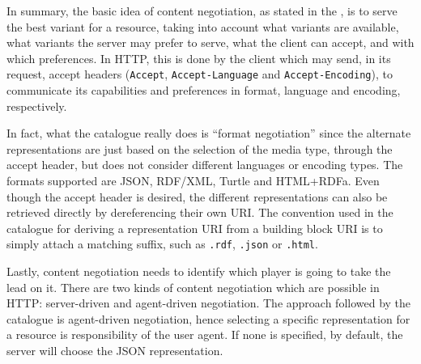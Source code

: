 
In summary, the basic idea of content negotiation, as stated in the \cite{http1.1}, is to serve the best variant for a resource, taking into account what variants are available, what variants the server may prefer to serve, what the client can accept, and with which preferences. In HTTP, this is done by the client which may send, in its request, accept headers (\texttt{Accept}, \texttt{Accept-Language} and \texttt{Accept-Encoding}), to communicate its capabilities and preferences in format, language and encoding, respectively.

In fact, what the catalogue really does is ``format negotiation'' since the alternate representations are just based on the selection of the media type, through the accept header, but does not consider different languages or encoding types. The formats supported are JSON, RDF/XML, Turtle and HTML+RDFa. Even though the accept header is desired, the different representations can also be retrieved directly by dereferencing their own URI. The convention used in the catalogue for deriving a representation URI from a building block URI is to simply attach a matching suffix, such as \texttt{.rdf}, \texttt{.json} or \texttt{.html}.

Lastly, content negotiation needs to identify which player is going to take the lead on it. There are two kinds of content negotiation which are possible in HTTP: server-driven and agent-driven negotiation. The approach followed by the catalogue is agent-driven negotiation, hence selecting a specific representation for a resource is responsibility of the user agent. If none is specified, by default, the server will choose the JSON representation.
